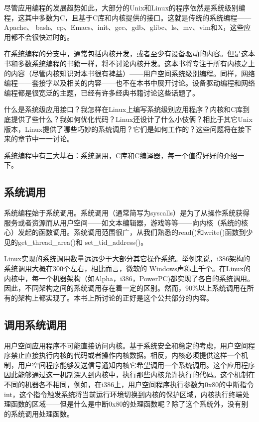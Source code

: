 尽管应用编程的发展趋势如此，大部分的Unix和Linux的程序依然是系统级别编程，这其中多数为C，且基于C库和内核提供的接口。这就是传统的系统编程——Apache、 bash、cp、Emacs、init、gcc、gdb、glibc、ls、mv、vim和X，这些应用都不会很快过时的。

在系统编程的分支中，通常包括内核开发，或者至少有设备驱动的内容。但是这本书和多数系统编程的书籍一样，将不讨论内核开发。这本书将专注于所有内核之上的内容（尽管内核知识对本书很有裨益）——用户空间系统级别编程。同样，网络编程——套接字以及相关的内容——也不在本书中展开讨论。设备驱动编程和网络编程都是很宽泛的主题，已经有许多经典书籍讨论这些话题了。

什么是系统级应用接口？我怎样在Linux上编写系统级别应用程序？内核和C库到底提供了些什么？我如何优化代码？Linux还设计了什么小伎俩？相比于其它Unix版本，Linux提供了哪些巧妙的系统调用？它们是如何工作的？这些问题将在接下来的章节中一一讨论。

系统编程中有三大基石：系统调用，C库和C编译器，每一个值得好好的介绍一下。 

\subsection{系统调用}
系统编程始于系统调用。系统调用（通常简写为syscalls）是为了从操作系统获得服务或者资源而从用户空间——如文本编辑器，游戏等等——向内核（系统的核心）发起的函数调用。系统调用范围很广，从我们熟悉的read()和write()函数到少见的get\_thread\_area()和 set\_tid\_address()。

Linux实现的系统调用数量远远少于大部分其它操作系统。举例来说，i386架构的系统调用大概在300个左右，相比而言，微软的 Windows声称上千个。在Linux的内核中，每一个机器架构（如Alpha，i386，PowerPC)都实现了各自的系统调用。因此，不同架构之间的系统调用存在着一定的区别。然而，90\%以上系统调用在所有的架构上都实现了。本书上所讨论的正好是这个公共部分的内容。 

\subsection{调用系统调用}

用户空间应用程序不可能直接访问内核。基于系统安全和稳定的考虑，用户空间程序禁止直接执行内核的代码或者操作内核数据。相反，内核必须提供这样一个机制，用户空间程序能够发送信号通知内核它希望调用一个系统调用。这个应用程序因此能够通过这一机制深入到内核中，执行那些内核允许执行的代码。这个机制在不同的机器各不相同，例如，在i386上，用户空间程序执行参数为0x80的中断指令int，这个指令触发系统将当前运行环境切换到内核的保护区域，内核执行终端处理函数的区域——但是什么是中断0x80的处理函数呢？除了这个系统外，没有别的系统调用处理函数。

